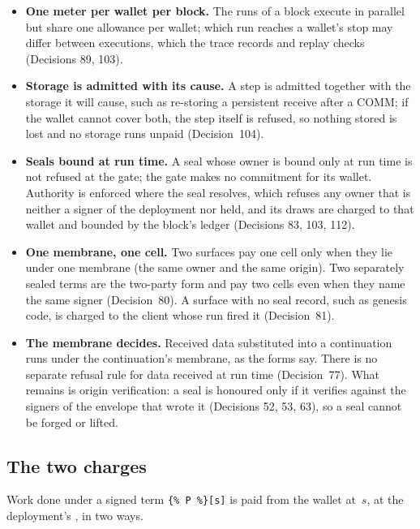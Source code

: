 \documentclass[11pt]{article}
\newcommand{\code}{\path}
\newcommand{\signed}[2]{\texttt{\{\%\,#1\,\%\}[#2]}}
\begin{document}
\begin{itemize}
\item \textbf{One meter per wallet per block.} The runs of a block execute in parallel but share one allowance per wallet; which run reaches a wallet's stop may differ between executions, which the trace records and replay checks (Decisions 89, 103).
\item \textbf{Storage is admitted with its cause.} A step is admitted together with the storage it will cause, such as re-storing a persistent receive after a COMM; if the wallet cannot cover both, the step itself is refused, so nothing stored is lost and no storage runs unpaid (Decision~104).
\item \textbf{Seals bound at run time.} A seal whose owner is bound only at run time is not refused at the gate; the gate makes no commitment for its wallet. Authority is enforced where the seal resolves, which refuses any owner that is neither a signer of the deployment nor held, and its draws are charged to that wallet and bounded by the block's ledger (Decisions 83, 103, 112).
\item \textbf{One membrane, one cell.} Two surfaces pay one cell only when they lie under one membrane (the same owner and the same origin). Two separately sealed terms are the two-party form and pay two cells even when they name the same signer (Decision~80). A surface with no seal record, such as genesis code, is charged to the client whose run fired it (Decision~81).
\item \textbf{The membrane decides.} Received data substituted into a continuation runs under the continuation's membrane, as the forms say. There is no separate refusal rule for data received at run time (Decision~77). What remains is origin verification: a seal is honoured only if it verifies against the signers of the envelope that wrote it (Decisions 52, 53, 63), so a seal cannot be forged or lifted.
\end{itemize}

\subsection{The two charges}\label{sec:charges}

Work done under a signed term \signed{P}{s} is paid from the wallet at~$s$, at the deployment's \code{phloPrice}, in two ways.
\end{document}
